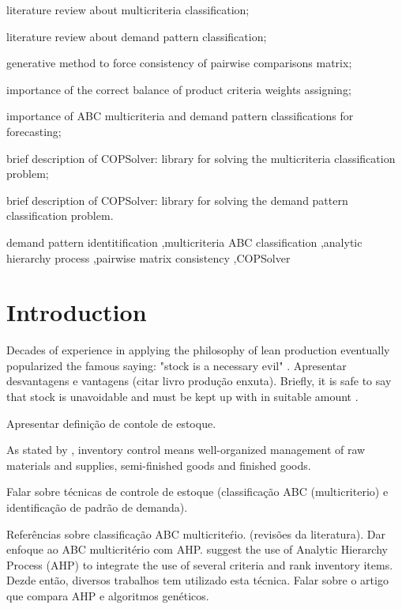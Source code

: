\documentclass[authoryear,manuscript,12pt]{elsarticle}
\begin{document}
\begin{frontmatter}
\begin{highlights}
\item literature review about multicriteria classification;
\item literature review about demand pattern classification;
\item generative method to force consistency of pairwise comparisons matrix;
\item importance of the correct balance of product criteria weights assigning;
\item importance of ABC multicriteria and demand pattern classifications for forecasting;
\item brief description of COPSolver: library for solving the multicriteria classification problem;
\item brief description of COPSolver: library for solving the demand pattern classification problem.
\end{highlights}

\begin{keyword}
demand pattern identitification \sep multicriteria ABC classification \sep analytic hierarchy process \sep pairwise matrix consistency \sep COPSolver
\end{keyword}
\end{frontmatter}


\section{Introduction}
\label{sec:intro}

Decades of experience in applying the philosophy of lean production eventually popularized the famous saying: "stock is a necessary evil" \citep{Younkin2021}. Apresentar desvantagens e vantagens (citar livro produção enxuta). Briefly, it is safe to say that stock is unavoidable and must be kept up with in suitable amount \citep{Nirmala2022}. 

Apresentar definição de contole de estoque. 

As stated by \citep{Nirmala2022}, inventory control means well-organized management of raw materials and supplies, semi-finished goods and finished goods.

Falar sobre técnicas de controle de estoque (classificação ABC (multicriterio) e identificação de padrão de demanda).

Referências sobre classificação ABC multicriteŕio. (revisões da literatura). Dar enfoque ao ABC multicritério com AHP. \cite{FloresEtAl1992} suggest the use of Analytic Hierarchy Process (AHP) to integrate the use of several criteria and rank inventory items. Dezde então, diversos trabalhos tem utilizado esta técnica. Falar sobre o artigo que compara AHP e algoritmos genéticos.
\end{document}
